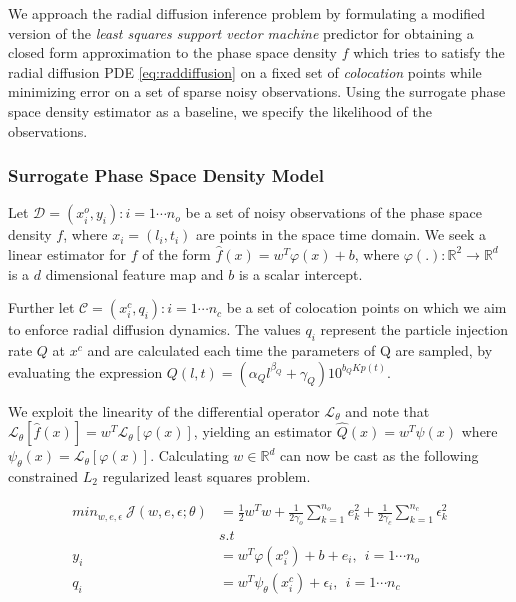 \documentclass{article}
\begin{document}
We approach the radial diffusion inference problem by formulating a
modified version of the \emph{least squares support vector machine}
predictor for obtaining a closed form approximation to the phase space
density $f$ which tries to satisfy the radial diffusion PDE
\ref{eq:raddiffusion} on a fixed set of \emph{colocation} points while
minimizing error on a set of sparse noisy observations. 
Using the surrogate phase space density estimator as a baseline, we
specify the likelihood of the observations.


\subsubsection*{Surrogate Phase Space Density Model}

Let $\mathcal{D}={(x^{o}_{i}, y_{i}): i = 1 \cdots n_{o}}$ be a set of
noisy observations of the phase space density $f$, where $x_{i} =
(l_{i}, t_{i})$ are points in the space time domain. We seek a linear
estimator for $f$ of the form $\hat{f}(x) = w^{T}\varphi(x) + b$,
where $\varphi(.): \mathbb{R}^{2} \rightarrow \mathbb{R}^{d}$ is a $d$
dimensional feature map and $b$ is a scalar intercept.

Further let $\mathcal{C} ={(x^{c}_{i}, q_{i}): i = 1 \cdots n_{c}}$ be 
a set of colocation points on which we aim to enforce radial diffusion
dynamics. The values $q_{i}$ represent the particle injection rate $Q$ at $x^c$ and 
are calculated each time the parameters of Q are sampled, by evaluating the expression 
$Q(l,t) = (\alpha_{Q}l^{\beta_{Q}} + \gamma_{Q})10^{b_{Q}Kp(t)}$.

We exploit the linearity of the differential operator
$\mathcal{L}_{\theta}$ and note that $\mathcal{L}_{\theta} [\hat{f}(x)]
= w^{T} \mathcal{L}_{\theta}[\varphi(x)]$, yielding an estimator
$\hat{Q}(x) = w^{T}\psi(x)$ where $\psi_{\theta}(x) =
\mathcal{L}_{\theta}[\varphi(x)]$. Calculating $w \in \mathbb{R}^d$
can now be cast as the following constrained $L_2$ regularized 
least squares problem.

\begin{align}\label{eq:surrogate}
   min_{w,e,\epsilon} \ \mathcal{J}(w,e,\epsilon;\theta) &= 
   \frac{1}{2} w^{T}w + \frac{1}{2\gamma_{o}} \sum_{k = 1}^{n_{o}}{e^{2}_{k}} + \frac{1}{2\gamma_{c}} \sum_{k = 1}^{n_{c}}{\epsilon^{2}_{k}} \\
  & s.t \nonumber \\
  y_{i} & = w^{T}\varphi(x^{o}_{i}) + b + e_{i}, \ \ i = 1 \cdots n_{o} \\
  q_{i} & = w^{T}\psi_{\theta}(x^{c}_{i}) + \epsilon_{i}, \ \ i = 1 \cdots n_{c}
\end{align}
\end{document}
